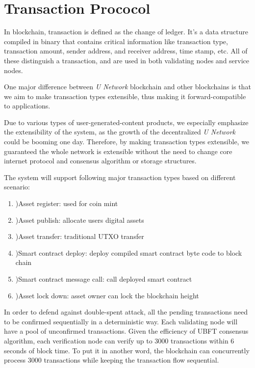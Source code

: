 \section{Transaction Prococol}

	In blockchain, transaction is defined as the change of ledger. It's a data structure compiled in binary that contains critical information like transaction type, transaction amount, sender address, and receiver address, time stamp, etc. All of these distinguish a transaction, and are used in both validating nodes and service nodes.  

    One major difference between \emph{U Network} blockchain and other blockchains is that we aim to make transaction types extensible, thus making it forward-compatible to applications. 
	
	Due to various types of user-generated-content products, we especially emphasize the extensibility of the system, as the growth of the decentralized \emph{U Network} could be booming one day. Therefore, by making transaction types extensible, we guaranteed the whole network is extensible without the need to change core internet protocol and consensus algorithm or storage structures.
	
	The system will support following major transaction types based on different scenario: 
	
	\begin{enumerate}
	\item )Asset register: used for coin mint
	\item )Asset publish: allocate users digital assets
    \item )Asset transfer: traditional UTXO transfer
    \item )Smart contract deploy: deploy compiled smart contract byte code to block chain
    \item )Smart contract message call: call deployed smart contract
    \item )Asset lock down: asset owner can lock the blockchain height
	\end{enumerate}
	
In order to defend against double-spent attack, all the pending transactions need to be confirmed sequentially in a deterministic way. Each validating node will have a pool of unconfirmed transactions. Given the efficiency of UBFT consensus algorithm, each verification node can verify up to 3000 transactions within 6 seconds of block time. To put it in another word, the blockchain can concurrently process 3000 transactions while keeping the transaction flow sequential. 



